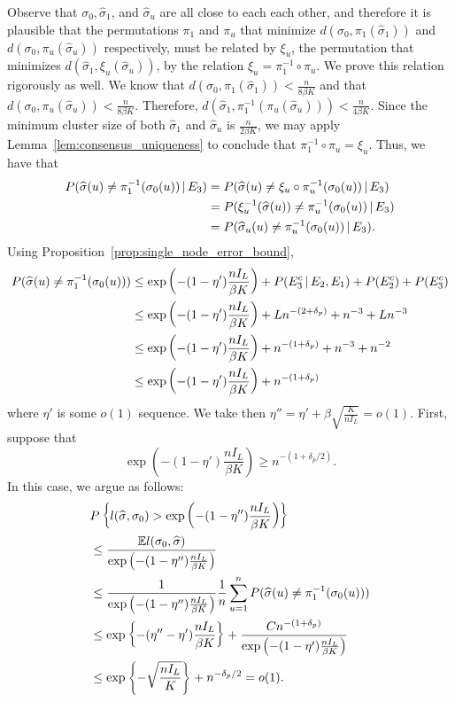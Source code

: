 \documentclass{article}
\begin{document}
Observe that $\sigma_0, \hat \sigma_1$, and $\hat \sigma_u$ are all close to each each other, and therefore it is plausible that the permutations $\pi_1$ and $\pi_u$ that minimize $d(\sigma_0, \pi_1(\hat \sigma_1))$ and $d(\sigma_0, \pi_u(\hat \sigma_u))$ respectively, must be related by $\xi_u$, the permutation that minimizes $d(\hat \sigma_1, \xi_u(\hat \sigma_u))$, by the relation $\xi_u = \pi_1^{-1} \circ \pi_u$. We prove this relation rigorously as well. We know that $d(\sigma_0, \pi_1(\hat{\sigma}_1)) < \frac{n}{8 \beta K}$ and that $d(\sigma_0, \pi_u(\hat{\sigma}_u)) < \frac{n}{8 \beta K}$. Therefore, $d(\hat{\sigma}_1, \pi_1^{-1}( \pi_u(\hat{\sigma}_u))) < \frac{n}{4 \beta K}$. Since the minimum cluster size of both $\hat{\sigma}_1$ and $\hat{\sigma}_u$ is $\frac{n}{2 \beta K}$, we may apply Lemma~\ref{lem:consensus_uniqueness} to conclude that $\pi_1^{-1} \circ \pi_u = \xi_u$. Thus, we have that
\begin{align*}
P( \widehat{\sigma}(u) \neq \pi_1^{-1} ( \sigma_0(u)) {\,|\,} E_3) &= P( \widehat{\sigma}(u) \neq \xi_u \circ \pi_u^{-1} (\sigma_0(u)) {\,|\,} E_3)\\
 &=  P( \xi_u^{-1}(\widehat{\sigma}(u)) \neq \pi_u^{-1} (\sigma_0(u)) {\,|\,} E_3)\\
 &= P( \widehat{\sigma}_u(u) \neq \pi_u^{-1} (\sigma_0(u)) {\,|\,} E_3). 
\end{align*}
Using Proposition~\ref{prop:single_node_error_bound}, 
\begin{align*}
P( \widehat{\sigma}(u) \neq \pi_1^{-1} ( \sigma_0(u)) ) &\leq  \exp\left( -(1 - \eta') \frac{n I_L}{\beta K} \right) + P(E_3^c {\,|\,} E_2, E_1) + P(E_2^c) + P(E_3^c) \\
    &\leq \exp\left( -(1 - \eta') \frac{n I_L}{\beta K} \right) + Ln^{-(2 + \delta_p)} + n^{-3} + Ln^{-3} \\
    &\leq  \exp\left( -(1 - \eta') \frac{n I_L}{\beta K} \right) + n^{-(1 + \delta_p)} + n^{-3} + n^{-2} \\
    &\leq  \exp\left( -(1 - \eta') \frac{n I_L}{\beta K} \right) + n^{-(1 + \delta_p)}
\end{align*}
where $\eta'$ is some $o(1)$ sequence. We take then $\eta'' = \eta' + \beta \sqrt{ \frac{K}{ n I_L} } = o(1)$. First, suppose that $$\exp\left( -(1 - \eta') \frac{n I_L}{\beta K} \right) \geq n^{-(1+\delta_p/2)}.$$
In this case, we argue as follows:
\begin{align*}
& P\left\{ l(\widehat{\sigma}, \sigma_0) >   \exp\left( -(1 - \eta'') \frac{n I_L}{\beta K} \right) \right\} \\
&\leq \frac{{\mathbb E} l(\sigma_0, \widehat \sigma)}{ \exp\left( -(1 - \eta'') \frac{n I_L}{\beta K} \right)}\\
 &\leq \frac{1}{ \exp\left( -(1 - \eta'') \frac{n I_L}{\beta K} \right) } \frac{1}{n} \sum_{u=1}^n P(\widehat{\sigma}(u) \neq \pi_1^{-1}(\sigma_0(u))) \\
 &\leq \exp\left\{ -(\eta'' - \eta') \frac{n I_L}{\beta K} \right\} + \frac{ C n^{-(1 + \delta_p)} }{ \exp\left( -(1 - \eta') \frac{n I_L}{\beta K} \right)  }\\
 &\leq \exp \left\{ - \sqrt{ \frac{n I_L}{K} } \right\} + n^{-\delta_p/2} = o(1).
\end{align*}
\end{document}
